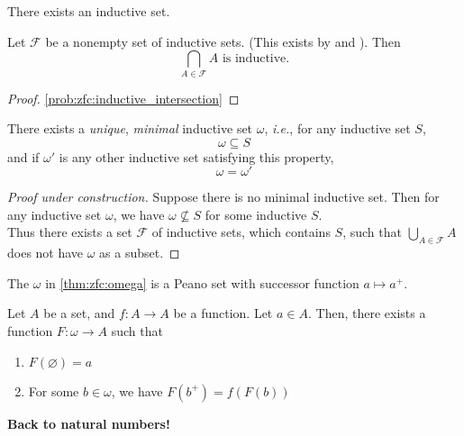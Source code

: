 \begin{axiom} \label{zfc:infinity}
    There exists an inductive set.    
\end{axiom}

\begin{lem} \label{thm:zfc:inductive_intersection}
    Let $\mathscr{F}$ be a nonempty set of inductive sets. (This exists by  and ). Then \[
        \bigcap_{A \in \mathscr{F}}{A} \text{ is inductive.}
    \]
\end{lem}
\begin{proof}
    \cref{prob:zfc:inductive_intersection}
\end{proof}

\begin{thm} \label{thm:zfc:omega}
    There exists a \emph{unique}, \emph{minimal} inductive set $\omega$, \textit{i.e.}, for any inductive set $S$, \[
        \omega \subseteq S
    \] and if $\omega'$ is any other inductive set satisfying this property, \[
        \omega = \omega'
    \]
\end{thm}
\begin{proof}[Proof under construction]
    Suppose there is no minimal inductive set. Then for any inductive set $\omega$, we have $ \omega \not\subseteq S$ for some inductive $S$. \\
    Thus there exists a set $\mathscr{F}$ of inductive sets, which contains $S$, such that $\bigcup_{A \in \mathscr{F}} A$ does not have $\omega$ as a subset.
\end{proof}


\begin{thm} \label{thm:zfc:omega_is_peano}
    The $\omega$ in \cref{thm:zfc:omega} is a Peano set with successor function $a \mapsto a^{+}$.
\end{thm}

\begin{thm} \label{thm:zfc:recursion}
    Let $A$ be a set, and $f: A \to A$ be a function. Let $a \in A$. Then, there exists a function $F: \omega \to A$ such that
    \begin{enumerate}[label=(\alph*)]
        \item $F(\varnothing) = a$
        \item For some $b \in \omega$, we have $F(b^{+}) = f(F(b))$
    \end{enumerate}
\end{thm}

\textbf{Back to natural numbers!}
